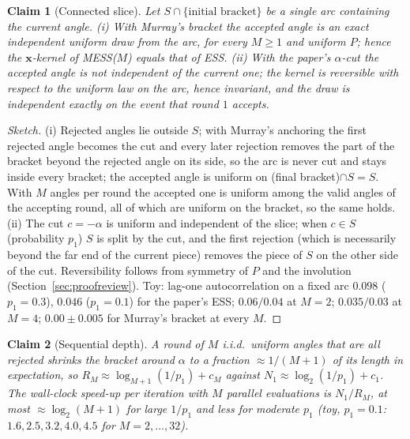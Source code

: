 \documentclass[11pt,a4paper]{article}
\newtheorem{claim}{Claim}
\theoremstyle{remark}
\newcommand{\bx}{\bm{x}}
\begin{document}
\begin{claim}[Connected slice]\label{cl:connected}
Let $S\cap\{\text{initial bracket}\}$ be a single arc containing the current angle. (i) With Murray's bracket the accepted angle is an exact independent uniform draw from the arc, for every $M\ge1$ and uniform $P$; hence the $\bx$-kernel of MESS($M$) equals that of ESS. (ii) With the paper's $\alpha$-cut the accepted angle is \emph{not} independent of the current one; the kernel is reversible with respect to the uniform law on the arc, hence invariant, and the draw is independent exactly on the event that round $1$ accepts.
\end{claim}
\begin{proof}[Sketch]
(i) Rejected angles lie outside $S$; with Murray's anchoring the first rejected angle becomes the cut and every later rejection removes the part of the bracket beyond the rejected angle on its side, so the arc is never cut and stays inside every bracket; the accepted angle is uniform on (final bracket)$\cap S=S$. With $M$ angles per round the accepted one is uniform among the valid angles of the accepting round, all of which are uniform on the bracket, so the same holds. (ii) The cut $c=-\alpha$ is uniform and independent of the slice; when $c\in S$ (probability $p_1$) $S$ is split by the cut, and the first rejection (which is necessarily beyond the far end of the current piece) removes the piece of $S$ on the other side of the cut. Reversibility follows from symmetry of $P$ and the involution (Section~\ref{sec:proofreview}). Toy: lag-one autocorrelation on a fixed arc $0.098$ ($p_1=0.3$), $0.046$ ($p_1=0.1$) for the paper's ESS; $0.06/0.04$ at $M=2$; $0.035/0.03$ at $M=4$; $0.00\pm0.005$ for Murray's bracket at every $M$.
\end{proof}

\begin{claim}[Sequential depth]\label{cl:depth}
A round of $M$ i.i.d.\ uniform angles that are all rejected shrinks the bracket around $\alpha$ to a fraction $\approx1/(M+1)$ of its length in expectation, so $R_M\approx\log_{M+1}(1/p_1)+c_M$ against $N_1\approx\log_2(1/p_1)+c_1$. The wall-clock speed-up per iteration with $M$ parallel evaluations is $N_1/R_M$, at most $\approx\log_2(M+1)$ for large $1/p_1$ and less for moderate $p_1$ (toy, $p_1=0.1$: $1.6,2.5,3.2,4.0,4.5$ for $M=2,\dots,32$).
\end{claim}
\end{document}
